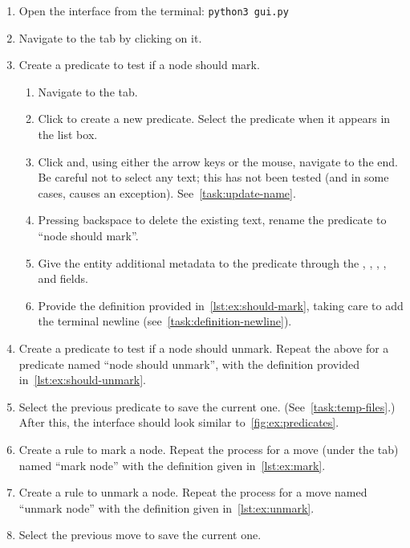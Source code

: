 \begin{enumerate}
\newcommand\bash[1]{\texttt{#1}}%
\item Open the interface from the terminal: \bash{python3 gui.py}
\item Navigate to the  tab by clicking on it.
\item Create a predicate to test if a node should mark.
  \begin{enumerate}
  \item Navigate to the  tab.
  \item Click  to create a new predicate.
    Select the predicate when it appears in the list box.
  \item Click  and, using either the arrow keys or the mouse, navigate to the end.
    Be careful not to select any text; this has not been tested (and in some cases, causes an exception).
    See~\autoref{task:update-name}.
  \item Pressing backspace \keys{\backspace} to delete the existing text,
    rename the predicate to \enquote{node should mark}.
  \item Give the entity additional metadata to the predicate through the
    ,
    ,
    \menu{\TeX},
    , and
     fields.
  \item Provide the definition provided in~\autoref{lst:ex:should-mark},
    taking care to add the terminal newline (see~\autoref{task:definition-newline}).
  \end{enumerate}
\item Create a predicate to test if a node should unmark.  Repeat the
  above for a predicate named \enquote{node should unmark}, with the
  definition provided in~\autoref{lst:ex:should-unmark}.
\item Select the previous predicate to save the current one.
  (See~\autoref{task:temp-files}.)
  After this, the interface should look similar to~\autoref{fig:ex:predicates}.
\item Create a rule to mark a node.
  Repeat the process for a move (under the  tab)
    named \enquote{mark node} with the definition given in~\autoref{lst:ex:mark}.
\item Create a rule to unmark a node.
  Repeat the process for a move
    named \enquote{unmark node} with the definition given in~\autoref{lst:ex:unmark}.
\item Select the previous move to save the current one.

\end{enumerate}
